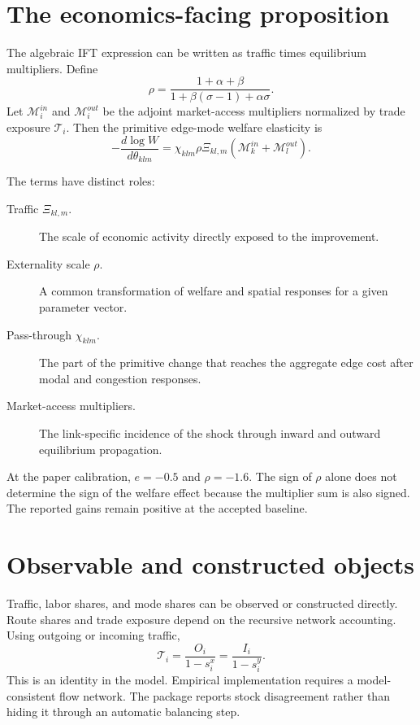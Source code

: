 \section{The economics-facing proposition}

The algebraic IFT expression can be written as traffic times equilibrium
multipliers. Define
\[
 \rho=\frac{1+\alpha+\beta}
 {1+\beta(\sigma-1)+\alpha\sigma}.
\]
Let \(\mathcal M_i^{in}\) and \(\mathcal M_i^{out}\) be the adjoint
market-access multipliers normalized by trade exposure \(\mathcal T_i\). Then
the primitive edge-mode welfare elasticity is
\[
 -\frac{d\log W}{d\theta_{klm}}
 =\chi_{klm}\rho\Xi_{kl,m}
 \left(\mathcal M_k^{in}+\mathcal M_l^{out}\right).
\]

The terms have distinct roles:
\begin{description}
  \item[Traffic \(\Xi_{kl,m}\).] The scale of economic activity directly
  exposed to the improvement.
  \item[Externality scale \(\rho\).] A common transformation of welfare and
  spatial responses for a given parameter vector.
  \item[Pass-through \(\chi_{klm}\).] The part of the primitive change that
  reaches the aggregate edge cost after modal and congestion responses.
  \item[Market-access multipliers.] The link-specific incidence of the shock
  through inward and outward equilibrium propagation.
\end{description}

At the paper calibration, \(e=-0.5\) and \(\rho=-1.6\). The sign of \(\rho\)
alone does not determine the sign of the welfare effect because the multiplier
sum is also signed. The reported gains remain positive at the accepted
baseline.

\section{Observable and constructed objects}

Traffic, labor shares, and mode shares can be observed or constructed directly.
Route shares and trade exposure depend on the recursive network accounting.
Using outgoing or incoming traffic,
\[
 \mathcal T_i=\frac{O_i}{1-s_i^x}
             =\frac{I_i}{1-s_i^y}.
\]
This is an identity in the model. Empirical implementation requires a
model-consistent flow network. The package reports stock disagreement rather
than hiding it through an automatic balancing step.

